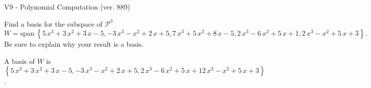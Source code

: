 \begin{exercise}
  \begin{exerciseTitle}V9 - Polynomial Computation (ver. 889)\end{exerciseTitle}
  \begin{exerciseStatement}
    Find a basis for the subspace of \(\mathcal{P}^3\) 
\[W=\mathrm{span}\ \left\{5 \, x^{3} + 3 \, x^{2} + 3 \, x - 5 , -3 \, x^{3} - x^{2} + 2 \, x + 5 , 7 \, x^{3} + 5 \, x^{2} + 8 \, x - 5 , 2 \, x^{3} - 6 \, x^{2} + 5 \, x + 1 , 2 \, x^{3} - x^{2} + 5 \, x + 3\right\}.\]
 Be sure to explain why your result is a basis.


  \end{exerciseStatement}
  \begin{exerciseAnswer}
   A basis of \(W\) is  \(\left\{5 \, x^{3} + 3 \, x^{2} + 3 \, x - 5 , -3 \, x^{3} - x^{2} + 2 \, x + 5 , 2 \, x^{3} - 6 \, x^{2} + 5 \, x + 1 2 \, x^{3} - x^{2} + 5 \, x + 3\right\}\).
  


  \end{exerciseAnswer}
\end{exercise}